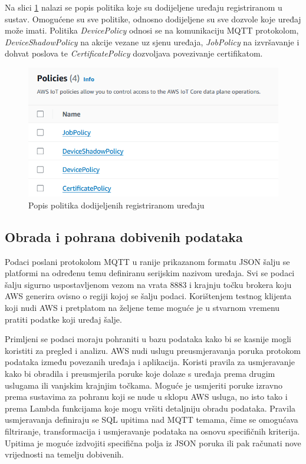 Na slici \ref{fig:policies} nalazi se popis politika koje su dodijeljene uređaju registriranom u sustav. Omogućene su sve politike, odnosno dodijeljene su sve dozvole koje uređaj može imati. Politika \textit{DevicePolicy} odnosi se na komunikaciju MQTT protokolom, \textit{DeviceShadowPolicy} na akcije vezane uz sjenu uređaja, \textit{JobPolicy} na izvršavanje i dohvat poslova te \textit{CertificatePolicy} dozvoljava povezivanje certifikatom. 

\begin{figure}[ht]
	\centering
	\includegraphics[scale=0.8]{imgs/policies}
	\caption{Popis politika dodijeljenih registriranom uređaju}
	\label{fig:policies}
\end{figure}

\subsection{Obrada i pohrana dobivenih podataka}

Podaci poslani protokolom MQTT u ranije prikazanom formatu JSON šalju se platformi na određenu temu definiranu serijskim nazivom uređaja. Svi se podaci šalju sigurno uspostavljenom vezom na vrata 8883 i krajnju točku brokera koju AWS generira ovisno o regiji kojoj se šalju podaci. Korištenjem testnog klijenta koji nudi AWS i pretplatom na željene teme moguće je u stvarnom vremenu pratiti podatke koji uređaj šalje. 

Primljeni se podaci moraju pohraniti u bazu podataka kako bi se kasnije mogli koristiti za pregled i analizu. AWS nudi uslugu preusmjeravanja poruka  protokom podataka između povezanih uređaja i aplikacija. Koristi pravila za usmjeravanje  kako bi obradila i preusmjerila poruke koje dolaze s uređaja prema drugim uslugama ili vanjskim krajnjim točkama. Moguće je usmjeriti poruke izravno prema sustavima za pohranu koji se nude u sklopu AWS usluga, no isto tako i prema Lambda funkcijama koje mogu vršiti detaljniju obradu podataka. Pravila usmjeravanja definiraju se SQL upitima nad MQTT temama, čime se omogućava filtriranje, transformacija i usmjeravanje podataka na osnovu specifičnih kriterija. Upitima je moguće izdvojiti specifična polja iz JSON poruka ili pak računati nove vrijednosti na temelju dobivenih. 

